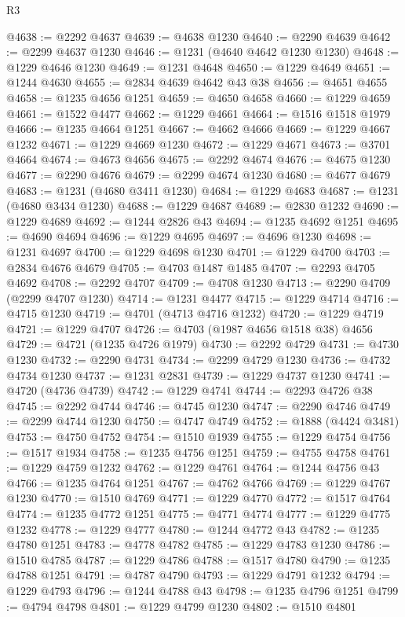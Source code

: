 \begin{lexlean}{R3}
\begin{coremodule}
@4638 := @2292 @4637
@4639 := @4638 @1230
@4640 := @2290 @4639
@4642 := @2299 @4637 @1230
@4646 := @1231 (@4640 @4642 @1230 @1230)
@4648 := @1229 @4646 @1230
@4649 := @1231 @4648
@4650 := @1229 @4649
@4651 := @1244 @4630
@4655 := @2834 @4639 @4642 @43 @38
@4656 := @4651 @4655
@4658 := @1235 @4656 @1251
@4659 := @4650 @4658
@4660 := @1229 @4659
@4661 := @1522 @4477
@4662 := @1229 @4661
@4664 := @1516 @1518 @1979
@4666 := @1235 @4664 @1251
@4667 := @4662 @4666
@4669 := @1229 @4667 @1232
@4671 := @1229 @4669 @1230
@4672 := @1229 @4671
@4673 := @3701 @4664
@4674 := @4673 @4656
@4675 := @2292 @4674
@4676 := @4675 @1230
@4677 := @2290 @4676
@4679 := @2299 @4674 @1230
@4680 := @4677 @4679
@4683 := @1231 (@4680 @3411 @1230)
@4684 := @1229 @4683
@4687 := @1231 (@4680 @3434 @1230)
@4688 := @1229 @4687
@4689 := @2830 @1232
@4690 := @1229 @4689
@4692 := @1244 @2826 @43
@4694 := @1235 @4692 @1251
@4695 := @4690 @4694
@4696 := @1229 @4695
@4697 := @4696 @1230
@4698 := @1231 @4697
@4700 := @1229 @4698 @1230
@4701 := @1229 @4700
@4703 := @2834 @4676 @4679
@4705 := @4703 @1487 @1485
@4707 := @2293 @4705 @4692
@4708 := @2292 @4707
@4709 := @4708 @1230
@4713 := @2290 @4709 (@2299 @4707 @1230)
@4714 := @1231 @4477
@4715 := @1229 @4714
@4716 := @4715 @1230
@4719 := @4701 (@4713 @4716 @1232)
@4720 := @1229 @4719
@4721 := @1229 @4707
@4726 := @4703 (@1987 @4656 @1518 @38) @4656
@4729 := @4721 (@1235 @4726 @1979)
@4730 := @2292 @4729
@4731 := @4730 @1230
@4732 := @2290 @4731
@4734 := @2299 @4729 @1230
@4736 := @4732 @4734 @1230
@4737 := @1231 @2831
@4739 := @1229 @4737 @1230
@4741 := @4720 (@4736 @4739)
@4742 := @1229 @4741
@4744 := @2293 @4726 @38
@4745 := @2292 @4744
@4746 := @4745 @1230
@4747 := @2290 @4746
@4749 := @2299 @4744 @1230
@4750 := @4747 @4749
@4752 := @1888 (@4424 @3481)
@4753 := @4750 @4752
@4754 := @1510 @1939
@4755 := @1229 @4754
@4756 := @1517 @1934
@4758 := @1235 @4756 @1251
@4759 := @4755 @4758
@4761 := @1229 @4759 @1232
@4762 := @1229 @4761
@4764 := @1244 @4756 @43
@4766 := @1235 @4764 @1251
@4767 := @4762 @4766
@4769 := @1229 @4767 @1230
@4770 := @1510 @4769
@4771 := @1229 @4770
@4772 := @1517 @4764
@4774 := @1235 @4772 @1251
@4775 := @4771 @4774
@4777 := @1229 @4775 @1232
@4778 := @1229 @4777
@4780 := @1244 @4772 @43
@4782 := @1235 @4780 @1251
@4783 := @4778 @4782
@4785 := @1229 @4783 @1230
@4786 := @1510 @4785
@4787 := @1229 @4786
@4788 := @1517 @4780
@4790 := @1235 @4788 @1251
@4791 := @4787 @4790
@4793 := @1229 @4791 @1232
@4794 := @1229 @4793
@4796 := @1244 @4788 @43
@4798 := @1235 @4796 @1251
@4799 := @4794 @4798
@4801 := @1229 @4799 @1230
@4802 := @1510 @4801

\end{coremodule}
\end{lexlean}

